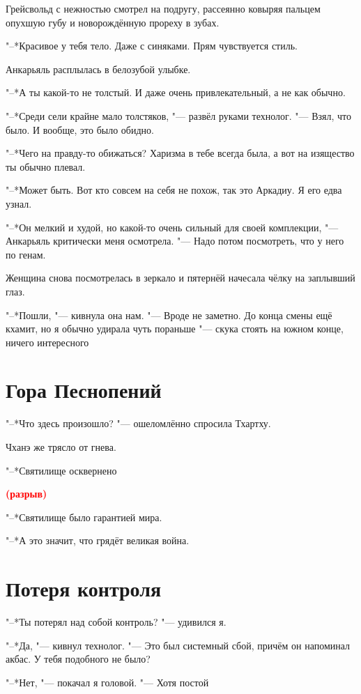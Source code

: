 \documentclass[a4paper,10pt,fleqn]{book}
\newcommand{\ldotst}{\so{...}\xspace}
\newcommand{\spacing}{\textcolor{red}{\textbf{(разрыв)}}}
\begin{document}
Грейсвольд с нежностью смотрел на подругу, рассеянно ковыряя пальцем опухшую губу и новорождённую прореху в зубах.

"--*Красивое у тебя тело.
Даже с синяками.
Прям чувствуется стиль.

Анкарьяль расплылась в белозубой улыбке.

"--*А ты какой-то не толстый.
И даже очень привлекательный, а не как обычно.

"--*Среди сели крайне мало толстяков, "--- развёл руками технолог.
"--- Взял, что было.
И вообще, это было обидно.

"--*Чего на правду-то обижаться?
Харизма в тебе всегда была, а вот на изящество ты обычно плевал.

"--*Может быть.
Вот кто совсем на себя не похож, так это Аркадиу.
Я его едва узнал.

"--*Он мелкий и худой, но какой-то очень сильный для своей комплекции, "--- Анкарьяль критически меня осмотрела.
"--- Надо потом посмотреть, что у него по генам.

Женщина снова посмотрелась в зеркало и пятернёй начесала чёлку на заплывший глаз.

"--*Пошли, "--- кивнула она нам.
"--- Вроде не заметно.
До конца смены ещё кхамит, но я обычно удирала чуть пораньше "--- скука стоять на южном конце, ничего интересного\ldotst

\section{Гора Песнопений}

"--*Что здесь произошло? "--- ошеломлённо спросила Тхартху.

Чханэ же трясло от гнева.

"--*Святилище осквернено\ldotst

\spacing

"--*Святилище было гарантией мира.

"--*А это значит, что грядёт великая война.

\section{Потеря контроля}

"--*Ты потерял над собой контроль? "--- удивился я.

"--*Да, "--- кивнул технолог.
"--- Это был системный сбой, причём он напоминал акбас.
У тебя подобного не было?

"--*Нет, "--- покачал я головой.
"--- Хотя постой\ldotst
\end{document}
